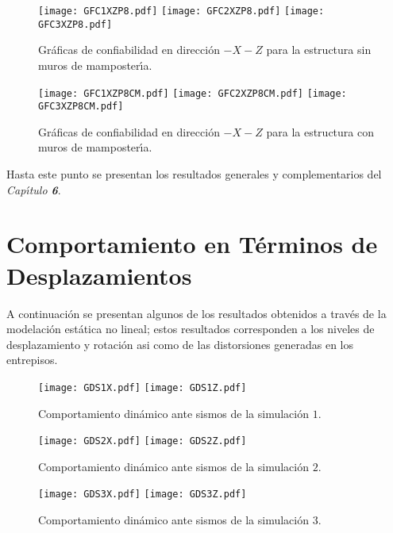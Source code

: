 \newpage

\begin{figure} [htbp]
\centering
\texttt{[image: GFC1XZP8.pdf]}
\texttt{[image: GFC2XZP8.pdf]}
\texttt{[image: GFC3XZP8.pdf]}
\caption{Gr\'aficas de confiabilidad en direcci\'on $-X-Z$ para la estructura sin muros de mamposter\'{\i}a.}
\label{fig:apu65}
\end{figure}

\begin{figure} [htbp]
\centering
\texttt{[image: GFC1XZP8CM.pdf]}
\texttt{[image: GFC2XZP8CM.pdf]}
\texttt{[image: GFC3XZP8CM.pdf]}
\caption{Gr\'aficas de confiabilidad en direcci\'on $-X-Z$ para la estructura con muros de mamposter\'{\i}a.}
\label{fig:apu66}
\end{figure}

Hasta este punto se presentan los resultados generales y complementarios del \emph{Cap\'{\i}tulo \textbf{6}}.

\newpage

\section{Comportamiento en T\'erminos de Desplazamientos}

A continuaci\'on se presentan algunos de los resultados obtenidos a trav\'es de la modelaci\'on est\'atica no lineal; estos resultados corresponden a los niveles de desplazamiento y rotaci\'on asi como de las distorsiones generadas en los entrepisos.

\begin{figure} [htbp]
\texttt{[image: GDS1X.pdf]}
\texttt{[image: GDS1Z.pdf]}
\caption{Comportamiento din\'amico ante sismos de la simulaci\'on $1$.}
\label{fig:apu67}
\end{figure}

\begin{figure} [htbp]
\texttt{[image: GDS2X.pdf]}
\texttt{[image: GDS2Z.pdf]}
\caption{Comportamiento din\'amico ante sismos de la simulaci\'on $2$.}
\label{fig:apu68}
\end{figure}

\begin{figure} [htbp]
\texttt{[image: GDS3X.pdf]}
\texttt{[image: GDS3Z.pdf]}
\caption{Comportamiento din\'amico ante sismos de la simulaci\'on $3$.}
\label{fig:apu69}
\end{figure}

